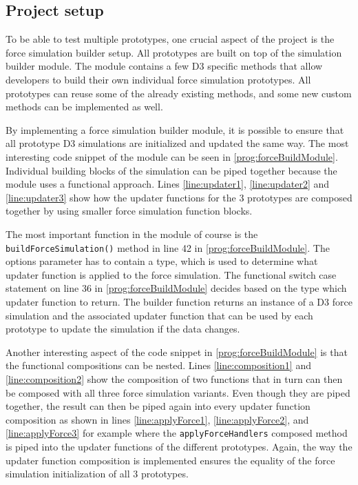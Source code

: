 \subsection{Project setup}
\label{sub:projectSetup}

To be able to test multiple prototypes, one crucial aspect of the project is the force simulation builder setup. All prototypes are built on top of the simulation builder module. The module contains a few D3 specific methods that allow developers to build their own individual force simulation prototypes. All prototypes can reuse some of the already existing methods, and some new custom methods can be implemented as well.

By implementing a force simulation builder module, it is possible to ensure that all prototype D3 simulations are initialized and updated the same way. The most interesting code snippet of the module can be seen in \ref{prog:forceBuildModule}. Individual building blocks of the simulation can be piped together because the module uses a functional approach. Lines \ref{line:updater1}, \ref{line:updater2} and \ref{line:updater3} show how the updater functions for the 3 prototypes are composed together by using smaller force simulation function blocks.

The most important function in the module of course is the \texttt{buildForceSimulation()} method in line 42 in \ref{prog:forceBuildModule}. The options parameter has to contain a type, which is used to determine what updater function is applied to the force simulation. The functional switch case statement on line 36 in \ref{prog:forceBuildModule} decides based on the type which updater function to return. The builder function returns an instance of a D3 force simulation and the associated updater function that can be used by each prototype to update the simulation if the data changes.

Another interesting aspect of the code snippet in \ref{prog:forceBuildModule} is that the functional compositions can be nested. Lines \ref{line:composition1} and \ref{line:composition2} show the composition of two functions that in turn can then be composed with all three force simulation variants. Even though they are piped together, the result can then be piped again into every updater function composition as shown in lines \ref{line:applyForce1}, \ref{line:applyForce2}, and \ref{line:applyForce3} for example where the \texttt{applyForceHandlers} composed method is piped into the updater functions of the different prototypes. Again, the way the updater function composition is implemented ensures the equality of the force simulation initialization of all 3 prototypes.

